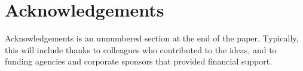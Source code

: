
\section*{Acknowledgements}

Acknowledgements is an unnumbered section at the end of the paper. Typically, this will include thanks to colleagues who contributed to the ideas, and to funding agencies and corporate sponsors that provided financial support.